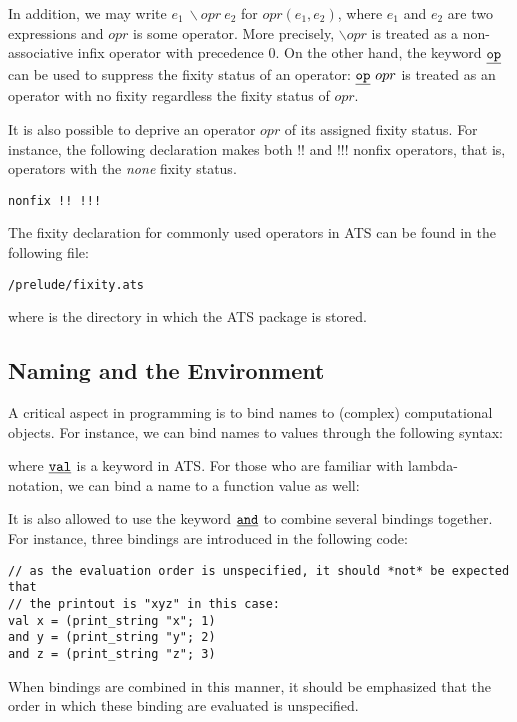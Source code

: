 In addition, we may write $e_1~\backslash opr~e_2$ for $opr(e_1, e_2)$,
where $e_1$ and $e_2$ are two expressions and $opr$ is some operator. More
precisely, $\backslash opr$ is treated as a non-associative infix operator
with precedence $0$.  On the other hand, the keyword $\underline{\texttt{op}}$ can be used to
suppress the fixity status of an operator: $\underline{\texttt{op}}~opr$ is treated as an
operator with no fixity regardless the fixity status of $opr$.

It is also possible to deprive an operator $opr$ of its assigned fixity
status. For instance, the following declaration makes both $!!$ and $!!!$
nonfix operators, that is, operators with the {\it none} fixity status.
\begin{verbatim}
nonfix !! !!!
\end{verbatim}
The fixity declaration for commonly used operators in ATS can be found
in the following file:
\begin{center}
\texttt{\ATSHOME/prelude/fixity.ats}
\end{center}
where \texttt{\ATSHOME} is the directory in which the ATS package is stored.

\subsection{Naming and the Environment}
A critical aspect in programming is to bind names to (complex)
computational objects. For instance, we can bind names to values through
the following syntax:

where $\underline{\texttt{val}}$ is a keyword in ATS.  For those who are familiar with
lambda-notation, we can bind a name to a function value as well:

It is also allowed to use the keyword $\underline{\texttt{and}}$ to combine several bindings
together. For instance, three bindings are introduced in the following
code:
\begin{verbatim}
// as the evaluation order is unspecified, it should *not* be expected that
// the printout is "xyz" in this case:
val x = (print_string "x"; 1)
and y = (print_string "y"; 2)
and z = (print_string "z"; 3)
\end{verbatim}
When bindings are combined in this manner, it should be emphasized that
the order in which these binding are evaluated is unspecified.



